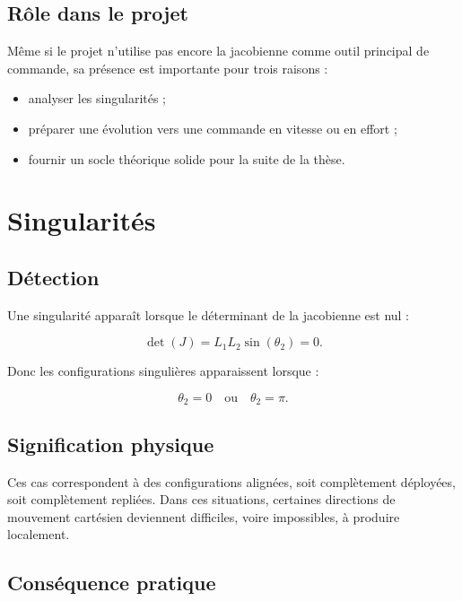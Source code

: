 \documentclass[12pt,a4paper]{report}
\newcommand{\Lone}{L_1}
\newcommand{\Ltwo}{L_2}
\newcommand{\thtwo}{\theta_2}
\begin{document}
\subsection{Rôle dans le projet}

Même si le projet n'utilise pas encore la jacobienne comme outil principal de commande,
sa présence est importante pour trois raisons :

\begin{itemize}
    \item analyser les singularités ;
    \item préparer une évolution vers une commande en vitesse ou en effort ;
    \item fournir un socle théorique solide pour la suite de la thèse.
\end{itemize}

\section{Singularités}

\subsection{Détection}

Une singularité apparaît lorsque le déterminant de la jacobienne est nul :

\begin{equation}
    \det(J) = \Lone \Ltwo \sin(\thtwo) = 0.
\end{equation}

Donc les configurations singulières apparaissent lorsque :

\begin{equation}
    \thtwo = 0 \quad \text{ou} \quad \thtwo = \pi.
\end{equation}

\subsection{Signification physique}

Ces cas correspondent à des configurations alignées, soit complètement déployées,
soit complètement repliées. Dans ces situations, certaines directions de mouvement
cartésien deviennent difficiles, voire impossibles, à produire localement.

\subsection{Conséquence pratique}
\end{document}
